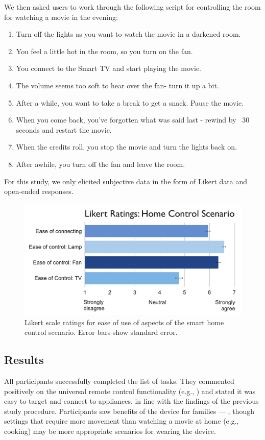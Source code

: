 We then asked users to work through the following script for controlling the room for watching a movie in the evening:
{\small
\begin{enumerate}
\item Turn off the lights as you want to watch the movie in a darkened room.
\item You feel a little hot in the room, so you turn on the fan.
\item You connect to the Smart TV and start playing the movie. 
\item The volume seems too soft to hear over the fan- turn it up a bit. 
\item After a while, you want to take a break to get a snack. Pause the movie. 
\item When you come back, you've forgotten what was said last - rewind by ~30 seconds and restart the movie. 
\item When the credits roll, you stop the movie and turn the lights back on.
\item After awhile, you turn off the fan and leave the room.
\end{enumerate}
}

For this study, we only elicited subjective data in the form of Likert data and open-ended responses.
\begin{figure}[t]
\centering
\includegraphics[width=1.0\columnwidth]{figures/scenario-likert.pdf}
\caption{Likert scale ratings for ease of use of aspects of the smart home control scenario. Error bars show standard error.}
\label{fig:smarthome-likert}
\end{figure}

\subsection{Results}
All participants successfully completed the list of tasks. They commented positively on the universal remote control functionality (e.g., ) and stated it was easy to target and connect to appliances, in line with the findings of the previous study procedure. Participants saw benefits of the device for families --- , though settings that require more movement than watching a movie at home (e.g., cooking) may be more appropriate scenarios for wearing the device. 


